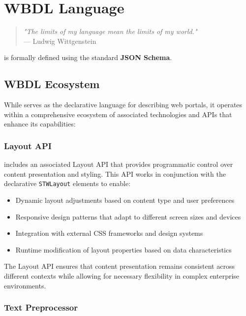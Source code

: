 
\chapter{WBDL Language}
\label{chap:wbdl}

\begin{quote}
\textit{"The limits of my language mean the limits of my world."} \\
— Ludwig Wittgenstein
\end{quote}

\wbdl{} is formally defined using the standard \textbf{JSON Schema}.

\section{WBDL Ecosystem}
\label{sec:wbdl-ecosystem}

While \wbdl{} serves as the declarative language for describing web portals, it operates within a comprehensive ecosystem of associated technologies and APIs that enhance its capabilities:

\subsection{Layout API}
\label{sec:layout-api}

\wbdl{} includes an associated Layout API that provides programmatic control over content presentation and styling. This API works in conjunction with the declarative \texttt{STWLayout} elements to enable:

\begin{itemize}
\item Dynamic layout adjustments based on content type and user preferences
\item Responsive design patterns that adapt to different screen sizes and devices
\item Integration with external CSS frameworks and design systems
\item Runtime modification of layout properties based on data characteristics
\end{itemize}

The Layout API ensures that content presentation remains consistent across different contexts while allowing for necessary flexibility in complex enterprise environments.

\subsection{Text Preprocessor}
\label{sec:text-preprocessor}

